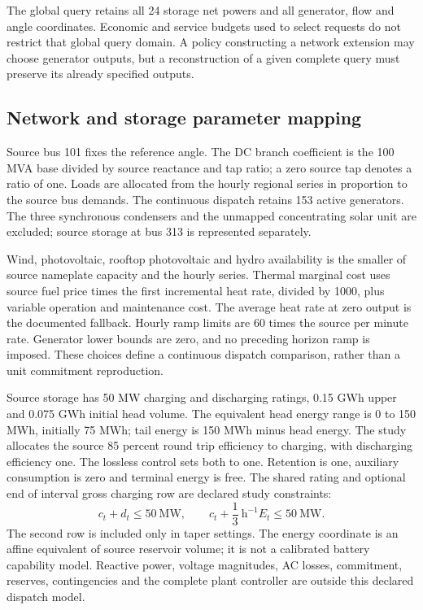 The global query retains all 24 storage net powers and all generator, flow
and angle coordinates. Economic and service budgets used to select requests
do not restrict that global query domain. A policy constructing a network
extension may choose generator outputs, but a reconstruction of a given
complete query must preserve its already specified outputs.


\subsection{Network and storage parameter mapping}
Source bus 101 fixes the reference angle. The DC branch coefficient is
the 100 MVA base divided by source reactance and tap ratio; a zero source
tap denotes a ratio of one. Loads are allocated from the hourly regional
series in proportion to the source bus demands. The continuous dispatch
retains 153 active generators. The three synchronous condensers and the
unmapped concentrating solar unit are excluded; source storage at bus 313
is represented separately.

Wind, photovoltaic, rooftop photovoltaic and hydro availability is the
smaller of source nameplate capacity and the hourly series. Thermal
marginal cost uses source fuel price times the first incremental heat rate,
divided by 1000, plus variable operation and maintenance cost. The average
heat rate at zero output is the documented fallback. Hourly ramp limits
are 60 times the source per minute rate. Generator lower bounds are zero,
and no preceding horizon ramp is imposed. These choices define a
continuous dispatch comparison, rather than a unit commitment reproduction.

Source storage has 50 MW charging and discharging ratings, 0.15 GWh upper
and 0.075 GWh initial head volume. The equivalent head energy range is
0 to 150 MWh, initially 75 MWh; tail energy is 150 MWh minus head energy.
The study allocates the source 85 percent round trip efficiency to charging,
with discharging efficiency one. The lossless control sets both to one.
Retention is one, auxiliary consumption is zero and terminal energy is free.
The shared rating and optional end of interval gross charging row are
declared study constraints:
\begin{equation}
c_t+d_t\leq 50~\mathrm{MW},\qquad
c_t+\frac{1}{3}~\mathrm{h}^{-1}E_t\leq50~\mathrm{MW}.
\label{eq:rts_study_rows}
\end{equation}
The second row is included only in taper settings. The energy coordinate
is an affine equivalent of source reservoir volume; it is not a calibrated
battery capability model. Reactive power, voltage magnitudes, AC losses,
commitment, reserves, contingencies and the complete plant controller are
outside this declared dispatch model.

